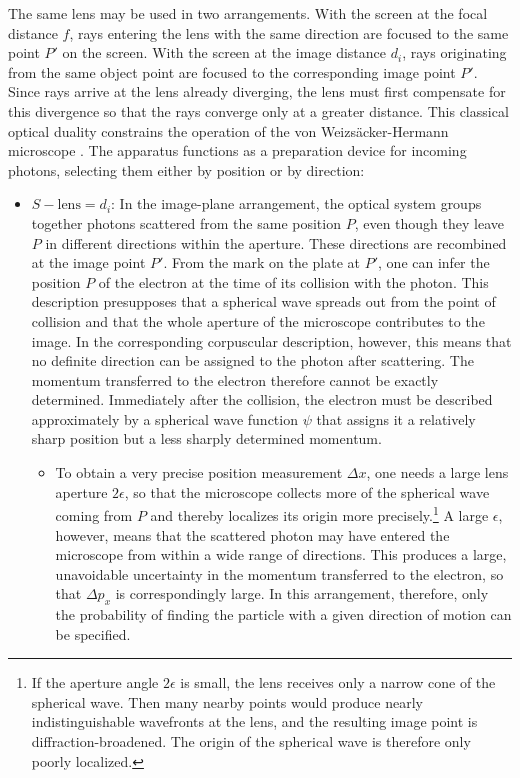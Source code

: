 \documentclass[pdflatex]{sn-jnl}
\newcommand{\vW}{von Weizsäcker\xspace}
\newcommand{\HW}{\vW-Hermann\xspace}
\newcommand{\pos}{\ensuremath{x}\xspace}
\newcommand{\mom}{\ensuremath{p_x}\xspace}
\begin{document}
The same lens may be used in two arrangements. With the screen at the focal distance $f$, rays entering the lens with the same direction are focused to the same point $P'$ on the screen. With the screen at the image distance $d_i$, rays originating from the same object point are focused to the corresponding image point $P'$. Since rays arrive at the lens already diverging, the lens must first compensate for this divergence so that the rays converge only at a greater distance. This classical optical duality constrains the operation of the \HW microscope \citep[\S10]{Hermann1935}. The apparatus functions as a preparation device for incoming photons, selecting them either by position or by direction:
%
\begin{itemize}
\item $S-\text{lens}=d_i$: In the image-plane arrangement, the optical system groups together photons scattered from the same position $P$, even though they leave $P$ in different directions within the aperture. These directions are recombined at the image point $P'$. From the mark on the plate at $P'$, one can infer the position $P$ of the electron at the time of its collision with the photon. This description presupposes that a spherical wave spreads out from the point of collision and that the whole aperture of the microscope contributes to the image. In the corresponding corpuscular description, however, this means that no definite direction can be assigned to the photon after scattering. The momentum transferred to the electron therefore cannot be exactly determined. Immediately after the collision, the electron must be described approximately by a spherical wave function $\psi$ that assigns it a relatively sharp position but a less sharply determined momentum.

\begin{itemize}
\item To obtain a very precise position measurement $\Delta \pos$, one needs a large lens aperture $2\epsilon$, so that the microscope collects more of the spherical wave coming from $P$ and thereby localizes its origin more precisely.\footnote{If the aperture angle $2\epsilon$ is small, the lens receives only a narrow cone of the spherical wave. Then many nearby points would produce nearly indistinguishable wavefronts at the lens, and the resulting image point is diffraction-broadened. The origin of the spherical wave is therefore only poorly localized.} A large $\epsilon$, however, means that the scattered photon may have entered the microscope from within a wide range of directions. This produces a large, unavoidable uncertainty in the momentum transferred to the electron, so that $\Delta \mom$ is correspondingly large. In this arrangement, therefore, only the probability of finding the particle with a given direction of motion can be specified.
\end{itemize}


\end{itemize}
\end{document}
